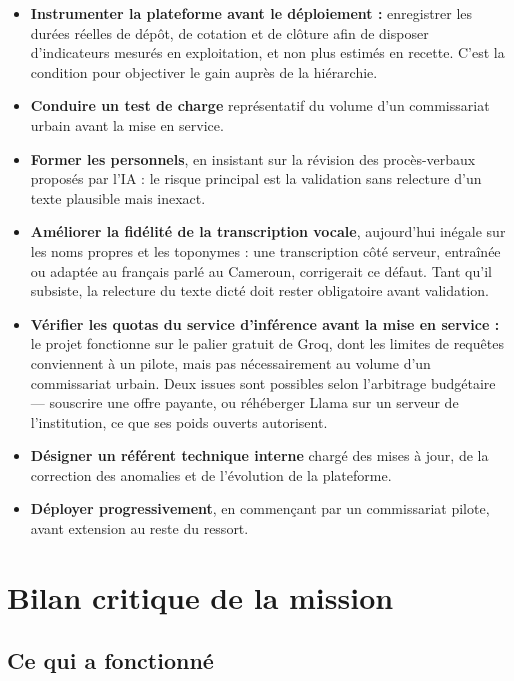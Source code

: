 \begin{itemize}
    \item \textbf{Instrumenter la plateforme avant le déploiement :} enregistrer les durées réelles de dépôt, de cotation et de clôture afin de disposer d'indicateurs mesurés en exploitation, et non plus estimés en recette. C'est la condition pour objectiver le gain auprès de la hiérarchie.
    \item \textbf{Conduire un test de charge} représentatif du volume d'un commissariat urbain avant la mise en service.
    \item \textbf{Former les personnels}, en insistant sur la révision des procès-verbaux proposés par l'IA : le risque principal est la validation sans relecture d'un texte plausible mais inexact.
    \item \textbf{Améliorer la fidélité de la transcription vocale}, aujourd'hui inégale sur les noms propres et les toponymes : une transcription côté serveur, entraînée ou adaptée au français parlé au Cameroun, corrigerait ce défaut. Tant qu'il subsiste, la relecture du texte dicté doit rester obligatoire avant validation.
    \item \textbf{Vérifier les quotas du service d'inférence avant la mise en service :} le projet fonctionne sur le palier gratuit de Groq, dont les limites de requêtes conviennent à un pilote, mais pas nécessairement au volume d'un commissariat urbain. Deux issues sont possibles selon l'arbitrage budgétaire — souscrire une offre payante, ou réhéberger Llama sur un serveur de l'institution, ce que ses poids ouverts autorisent.
    \item \textbf{Désigner un référent technique interne} chargé des mises à jour, de la correction des anomalies et de l'évolution de la plateforme.
    \item \textbf{Déployer progressivement}, en commençant par un commissariat pilote, avant extension au reste du ressort.
\end{itemize}

\section{Bilan critique de la mission}

\subsection{Ce qui a fonctionné}

